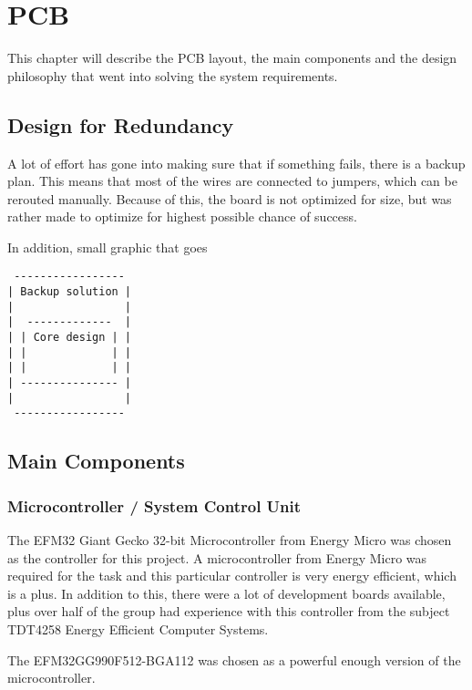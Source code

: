 \chapter{PCB}
\label{sec:pcb}

This chapter will describe the PCB layout, the main components and the design philosophy that went into solving the system requirements.


\section{Design for Redundancy}

A lot of effort has gone into making sure that if something fails, there is a backup plan.
This means that most of the wires are connected to jumpers, which can be rerouted manually.
Because of this, the board is not optimized for size, but was rather made to optimize for
highest possible chance of success.

In addition, small graphic that goes 

\begin{verbatim}
 -----------------
| Backup solution |
|                 |
|  -------------  |
| | Core design | |
| |             | |
| |             | |
| --------------- |
|                 |
 -----------------
\end{verbatim}

\section{Main Components}

\subsection{Microcontroller / System Control Unit}
The EFM32 Giant Gecko 32-bit Microcontroller from Energy Micro was chosen as the controller for this project.
A microcontroller from Energy Micro was required for the task and this particular controller is
very energy efficient, which is a plus.
In addition to this, there were a lot of development boards available,
plus over half of the group had experience with this controller from the subject
TDT4258 Energy Efficient Computer Systems.

The EFM32GG990F512-BGA112 was chosen as a powerful enough version of the microcontroller.

